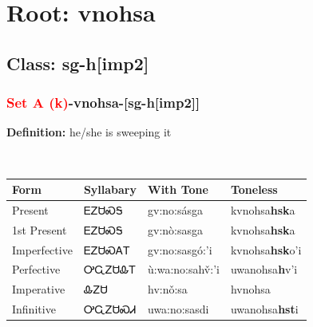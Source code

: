 \needspace{4in}
\section*{Root: vnohsa}
\nopagebreak
{}
\needspace{3in}
\subsection*{Class: sg-h[imp2]}
\nopagebreak
\needspace{2in}
\subsubsection*{\textcolor{Red}{Set A (k)}{-}\textbf{vnohsa}{-}[sg-h[imp2]]}
\nopagebreak
\textbf{Definition: } he/she is sweeping it
\\[0.5em]
\begin{tabularx}{\textwidth}{l X X X}%
\toprule%
\textbf{Form}&\textbf{Syllabary}&\textbf{With Tone}&\textbf{Toneless}\\%
\midrule%
Present&ᎬᏃᏌᏍᎦ&gv:no:sásga&kvnohsa\textbf{hsk}a\\%
1st Present&ᎬᏃᏌᏍᎦ&gv:nò:sasga&kvnohsa\textbf{hsk}a\\%
Imperfective&ᎬᏃᏌᏍᎪᎢ&gv:no:sasgó:’i&kvnohsa\textbf{hsk}o'i\\%
Perfective&ᎤᏩᏃᏌᎲᎢ&ù:wa:no:sahv̌:’i&uwanohsa\textbf{h}v'i\\%
Imperative&ᎲᏃᏌ&hv:nǒ:sa&hvnohsa\textbf{}\\%
Infinitive&ᎤᏩᏃᏌᏍᏗ&uwa:no:sasdi&uwanohsa\textbf{hst}i\\%
\bottomrule%
\end{tabularx}
\\[1em]